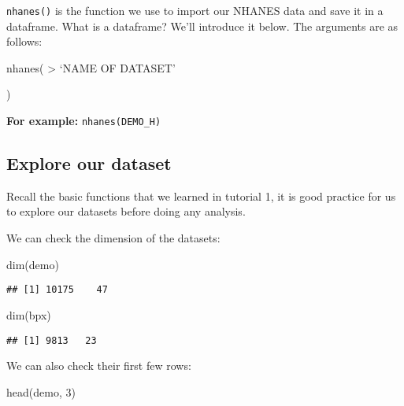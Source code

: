 \documentclass[
]{book}
\newenvironment{Shaded}{\begin{snugshade}}{\end{snugshade}}
\newcommand{\DecValTok}[1]{\textcolor[rgb]{0.00,0.00,0.81}{#1}}
\newcommand{\FunctionTok}[1]{\textcolor[rgb]{0.00,0.00,0.00}{#1}}
\newcommand{\NormalTok}[1]{#1}
\begin{document}
\texttt{nhanes()} is the function we use to import our NHANES data and save it in a dataframe. What is a dataframe? We'll introduce it below. The arguments are as follows:

nhanes(
\textgreater{} `NAME OF DATASET'

)

\textbf{For example:} \texttt{nhanes(\textquotesingle{}DEMO\_H\textquotesingle{})}

\hypertarget{explore-our-dataset}{%
\subsection{Explore our dataset}\label{explore-our-dataset}}

Recall the basic functions that we learned in tutorial 1, it is good practice for us to explore our datasets before doing any analysis.

We can check the dimension of the datasets:

\begin{Shaded}
\begin{Highlighting}[]
\FunctionTok{dim}\NormalTok{(demo)}
\end{Highlighting}
\end{Shaded}

\begin{verbatim}
## [1] 10175    47
\end{verbatim}

\begin{Shaded}
\begin{Highlighting}[]
\FunctionTok{dim}\NormalTok{(bpx)}
\end{Highlighting}
\end{Shaded}

\begin{verbatim}
## [1] 9813   23
\end{verbatim}

We can also check their first few rows:

\begin{Shaded}
\begin{Highlighting}[]
\FunctionTok{head}\NormalTok{(demo, }\DecValTok{3}\NormalTok{)}
\end{Highlighting}
\end{Shaded}
\end{document}
